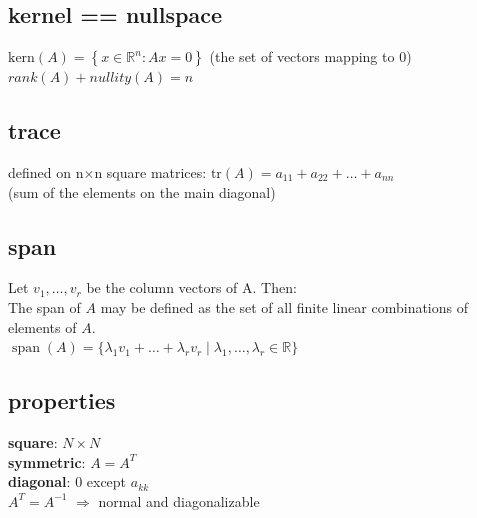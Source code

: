 \begin{multicols}{3}
\subsection{kernel == nullspace}
$\text{kern}(A) = \left\{ x\in\mathbb{R}^n : Ax = 0 \right\}$ \quad (the set of vectors mapping to 0)\\

$rank(A) + nullity(A) = n$\\

\subsection{trace}
defined on n$\times$n square matrices: $\mathrm{tr}(A) = a_{11} + a_{22} + \dots + a_{nn}$\\
(sum of the elements on the main diagonal)


\subsection{span}
Let $v_1,\dots,v_r$ be the column vectors of A. Then:\\
The span of $A$ may be defined as the set of all finite linear combinations of elements of $A$.\\
$\operatorname{span}(A) =  \{ {\lambda _1 v_1  +  \dots  + \lambda _r v_r \mid \lambda _1 , \dots ,\lambda _r  \in \mathbb{R}} \}$

\subsection{properties}
\textbf{square}: $N \times N$\\
\textbf{symmetric}: $A = A^T$\\
\textbf{diagonal}: 0 except $a_{kk}$\\

 $A^T = A^{-1}$
$\Rightarrow$ normal and diagonalizable\\


\end{multicols}
